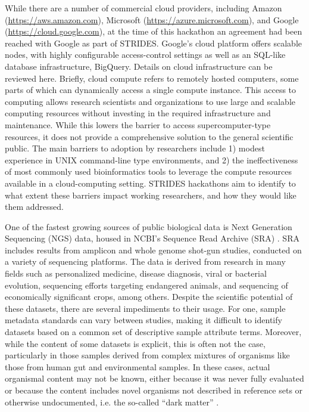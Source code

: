 While there are a number of commercial cloud providers, including Amazon
(\url{https://aws.amazon.com}), Microsoft (\url{https://azure.microsoft.com}),
 and Google (\url{https://cloud.google.com}), at the time of this hackathon an agreement had
been reached with Google as part of STRIDES. Google's cloud platform offers
scalable nodes, with highly configurable access-control settings as well as an
SQL-like database infrastructure, BigQuery. Details on cloud infrastructure can
be reviewed here. Briefly, cloud compute refers to remotely hosted computers,
some parts of which can dynamically access a single compute instance. This
access to computing allows research scientists and organizations to use large
and scalable computing resources without investing in the required
infrastructure and maintenance. While this lowers the barrier to access
supercomputer-type resources, it does not provide a comprehensive solution to
the general scientific public. The main barriers to adoption by researchers
include 1) modest experience in UNIX command-line type environments, and 2) the
ineffectiveness of most commonly used bioinformatics tools to leverage the
compute resources available in a cloud-computing setting. STRIDES hackathons
aim to identify to what extent these barriers impact working researchers, and
how they would like them addressed.

One of the fastest growing sources of public biological data is Next Generation
Sequencing (NGS) data, housed in NCBI's Sequence Read Archive (SRA)
\cite{Leinonen2010}. SRA includes results from amplicon and whole genome
shot-gun studies, conducted on a variety of sequencing platforms. The data is
derived from research in many fields such as personalized medicine, disease
diagnosis, viral or bacterial evolution, sequencing efforts targeting
endangered animals, and sequencing of economically significant crops, among
others. Despite the scientific potential of these datasets, there are several
impediments to their usage. For one, sample metadata standards can vary between
studies, making it difficult to identify datasets based on a common set of
descriptive sample attribute terms. Moreover, while the content of some
datasets is explicit, this is often not the case, particularly in those samples
derived from complex mixtures of organisms like those from human gut  and
environmental samples.  In these cases, actual organismal content may not be
known, either because it was never fully evaluated or because the content
includes novel organisms not described in reference sets or otherwise
undocumented, i.e. the so-called “dark matter” \cite{Roux2015}.

